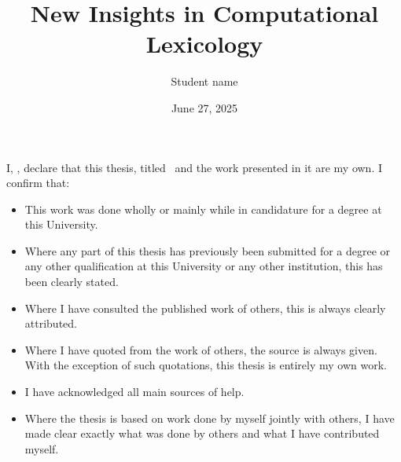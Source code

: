 \documentclass[11pt]{cltlmathesis}
\begin{document}


\title{New Insights in Computational Lexicology}  %
\author{Student name}                             %


\date{June 27, 2025}  %

\maketitle
\frontmatter



I, \@author, declare that this thesis, titled \showtitle\
 and the work presented in it are my own. I confirm that:
\begin{itemize}
\item This work was done wholly or mainly while in candidature for a \@degree degree at this University.
\item Where any part of this thesis has previously been submitted for a degree or any other qualification at this University or any other institution, this has been clearly stated.
\item Where I have consulted the published work of others, this is always clearly attributed.
\item Where I have quoted from the work of others, the source is always given. With the exception of such quotations, this thesis is entirely my own work.
\item I have acknowledged all main sources of help.
\item Where the thesis is based on work done by myself jointly with others, I have made
clear exactly what was done by others and what I have contributed myself.
\end{itemize}

\vspace{4cm}
\end{document}
